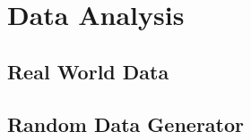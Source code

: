 \chapter{Data Analysis}\label{ch:dataanalysis}

\section{Real World Data}


\section{Random Data Generator}
